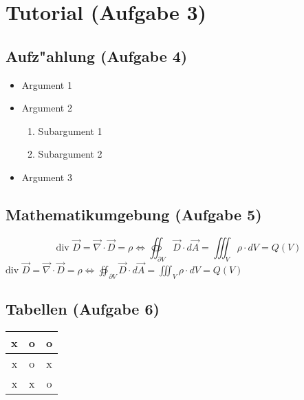 \section{Tutorial (Aufgabe 3)}
\subsection{Aufz"ahlung (Aufgabe 4)}
\begin{itemize}
  \item Argument 1
  \item Argument 2
  \begin{enumerate}
    \item Subargument 1
    \item Subargument 2
  \end{enumerate}
  \item Argument 3
\end{itemize}

\subsection{Mathematikumgebung (Aufgabe 5)}
\[ \text{div } \vec{D} = \vec{\nabla} \cdot \vec{D} = \rho \Leftrightarrow
\oiint_{\partial V}\vec{D}\cdot d\vec{A} = \iiint_V \rho \cdot dV = Q(V) \]
$ \text{div } \vec{D} = \vec{\nabla} \cdot \vec{D} = \rho \Leftrightarrow \oiint_{\partial V}\vec{D}\cdot d\vec{A} = \iiint_V \rho \cdot dV = Q(V) $

\subsection{Tabellen (Aufgabe 6)}
\begin{tabular}{c|c|c}
  x & o & o\\ \hline
  x & o & x\\ \hline
  x & x & o\\
\end{tabular}